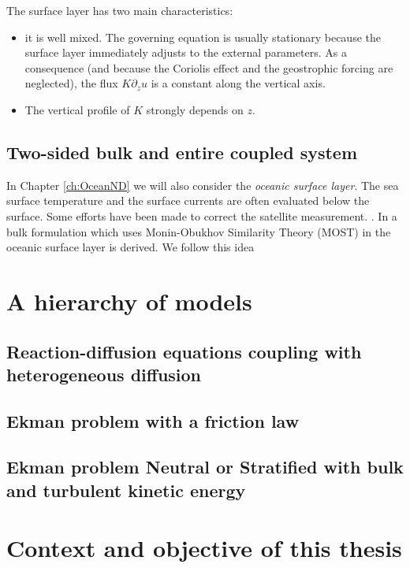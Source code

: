 The surface layer has two main characteristics:
\begin{itemize}
	\item it is well mixed. The governing equation
		is usually stationary because the surface layer
		immediately adjusts to the external parameters.
		As a consequence (and because the Coriolis effect
		and the geostrophic forcing are neglected),
		the flux $K \partial_z u$
		is a constant along the vertical axis.
	\item The vertical profile of $K$ strongly depends 
		on $z$.
\end{itemize}
\subsection{Two-sided bulk and entire coupled system}
\label{sec:airseaSCM_twoSided}
In Chapter \ref{ch:OceanND} we will also consider the
\textit{oceanic surface layer}.
The sea surface temperature and the surface currents are often
evaluated below the surface.
Some efforts have been made to correct the satellite measurement.
.
In \citep{pelletier_two-sided_2021} a bulk formulation which
uses Monin-Obukhov Similarity Theory (MOST) in the oceanic
surface layer is derived.
We follow this idea 

\section{A hierarchy of models}
\label{sec:airseaSCM_hierarchy}
\subsection{Reaction-diffusion equations coupling
with heterogeneous diffusion}
\subsection{Ekman problem with a friction law}
\label{sec:airseaSCM_hierarchy_Ekman}
\subsection{Ekman problem Neutral or Stratified with bulk and turbulent kinetic energy}
\section{Context and objective of this thesis}
\label{sec:airseaSCM_context_objectives}
